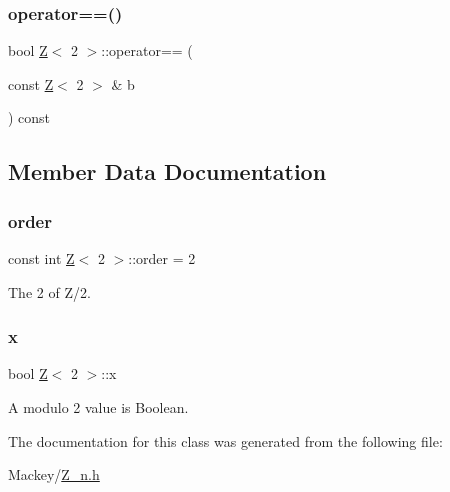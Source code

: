 \subsubsection{\texorpdfstring{operator==()}{operator==()}}
{\footnotesize\ttfamily bool \hyperlink{classZ}{Z}$<$ 2 $>$\+::operator== (\begin{DoxyParamCaption}\item[{const \hyperlink{classZ}{Z}$<$ 2 $>$ \&}]{b }\end{DoxyParamCaption}) const\hspace{0.3cm}{\ttfamily [inline]}}



\subsection{Member Data Documentation}
\mbox{\label{classZ_3_012_01_4_a113854b6a1c2fec88ed352c117515c0e}} 
\subsubsection{\texorpdfstring{order}{order}}
{\footnotesize\ttfamily const int \hyperlink{classZ}{Z}$<$ 2 $>$\+::order = 2\hspace{0.3cm}{\ttfamily [static]}}



The 2 of Z/2. 

\mbox{\label{classZ_3_012_01_4_ae753e180f5d8aa55370a497e2c86fbb8}} 
\subsubsection{\texorpdfstring{x}{x}}
{\footnotesize\ttfamily bool \hyperlink{classZ}{Z}$<$ 2 $>$\+::x}



A modulo 2 value is Boolean. 



The documentation for this class was generated from the following file\+:\begin{DoxyCompactItemize}
\item 
Mackey/\hyperlink{Z__n_8h}{Z\+\_\+n.\+h}\end{DoxyCompactItemize}

